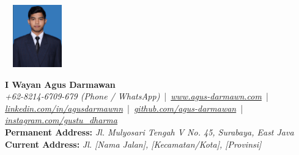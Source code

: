 \noindent
\begin{minipage}[c]{2.8cm}
    \includegraphics[width=2.8cm,height=2.7cm,keepaspectratio]{images/profile.png}
\end{minipage}%
\begin{minipage}[c]{\dimexpr\textwidth-2.8cm-1em\relax}
    \raggedright %
    \textbf{\LARGE I Wayan Agus Darmawan} \\[0.4em]    
    \textit{+62-8214-6709-679 (Phone / WhatsApp)} \,|\, 
    \href{https://agusdarmawn.com/}{\textit{www.agus-darmawn.com}} \,|\, 
    \href{https://www.linkedin.com/in/agusdarmawnn}{\textit{linkedin.com/in/agusdarmawnn}} \,|\, 
    \href{https://github.com/agus-darmawan}{\textit{github.com/agus-darmawan}} \,|\, 
    \href{https://www.instagram.com/gustu\textunderscore dharma/}{\textit{instagram.com/gustu\_dharma}} \\[0.8em]

    \textbf{Permanent Address:} \textit{Jl. Mulyosari Tengah V No. 45, Surabaya, East Java} \\[0.2em]
    \textbf{Current Address:} \textit{Jl. [Nama Jalan], [Kecamatan/Kota], [Provinsi]} %
\end{minipage}
